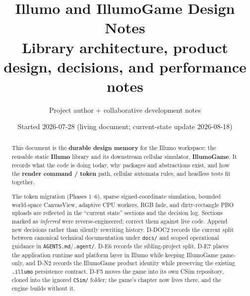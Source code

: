 \documentclass[11pt,a4paper]{article}
\title{%
  Illumo and IllumoGame Design Notes\\
  \large Library architecture, product design, decisions, and performance notes%
}
\author{Project author + collaborative development notes}
\date{Started 2026-07-28 \quad (living document; current-state update 2026-08-18)}
\newcommand{\pathref}[1]{\texttt{#1}}
\begin{document}
\maketitle

\begin{abstract}
This document is the \textbf{durable design memory} for the Illumo workspace:
the reusable static \textbf{Illumo} library and its downstream cellular
simulator, \textbf{IllumoGame}. It records what the code is doing today, why
packages and abstractions exist, and how the \textbf{render command / token}
path, cellular automata rules, and headless tests fit together.

The token migration (Phases 1--6), sparse signed-coordinate simulation,
bounded world-space CanvasView, adaptive CPU workers, RGB fade, and
dirty-rectangle PBO uploads are reflected
in the ``current state'' sections and the decision log. Sections marked as
\emph{inferred} were reverse-engineered; correct them against live code. Append
new decisions rather than silently rewriting history. D-DOC2 records the
current split between canonical technical documentation under
\pathref{docs/} and scoped operational guidance in
\pathref{AGENTS.md}/\pathref{.agent/}. D-E6 records the sibling-project split,
D-E7 places the application runtime and platform layer in Illumo while keeping
IllumoGame game-only, and D-N2 records the IllumoGame product identity while
preserving the existing \texttt{.illumo} persistence contract. D-F5 moves the
game into its own CSim repository, cloned into the ignored \pathref{CSim/}
folder; the game's chapter now lives there, and the engine builds without it.
\end{abstract}

\tableofcontents
\newpage













\appendix


\end{document}
